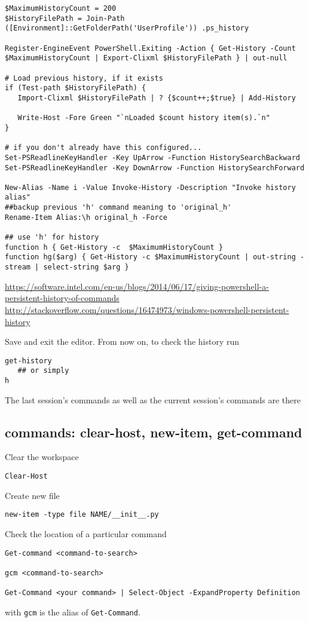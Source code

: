 \begin{verbatim}
$MaximumHistoryCount = 200  
$HistoryFilePath = Join-Path ([Environment]::GetFolderPath('UserProfile')) .ps_history

Register-EngineEvent PowerShell.Exiting -Action { Get-History -Count $MaximumHistoryCount | Export-Clixml $HistoryFilePath } | out-null

# Load previous history, if it exists
if (Test-path $HistoryFilePath) { 
   Import-Clixml $HistoryFilePath | ? {$count++;$true} | Add-History
   
   Write-Host -Fore Green "`nLoaded $count history item(s).`n" 
}

# if you don't already have this configured...
Set-PSReadlineKeyHandler -Key UpArrow -Function HistorySearchBackward
Set-PSReadlineKeyHandler -Key DownArrow -Function HistorySearchForward

New-Alias -Name i -Value Invoke-History -Description "Invoke history alias"
##backup previous 'h' command meaning to 'original_h'
Rename-Item Alias:\h original_h -Force

## use 'h' for history
function h { Get-History -c  $MaximumHistoryCount }
function hg($arg) { Get-History -c $MaximumHistoryCount | out-string -stream | select-string $arg }
\end{verbatim}
\url{https://software.intel.com/en-us/blogs/2014/06/17/giving-powershell-a-persistent-history-of-commands}
\url{http://stackoverflow.com/questions/16474973/windows-powershell-persistent-history}


Save and exit the editor. From now on, to check the history run
\begin{verbatim}
get-history
   ## or simply
h
\end{verbatim}
The last session's commands as well as the current session's commands are there

\subsection{commands: clear-host, new-item, get-command}

Clear the workspace
\begin{verbatim}
Clear-Host
\end{verbatim}

Create new file
\begin{verbatim}
new-item -type file NAME/__init__.py
\end{verbatim}

Check the location of a particular command
\begin{verbatim}
Get-command <command-to-search>

gcm <command-to-search>

Get-Command <your command> | Select-Object -ExpandProperty Definition
\end{verbatim}
with \verb!gcm! is the alias of \verb!Get-Command!. 


